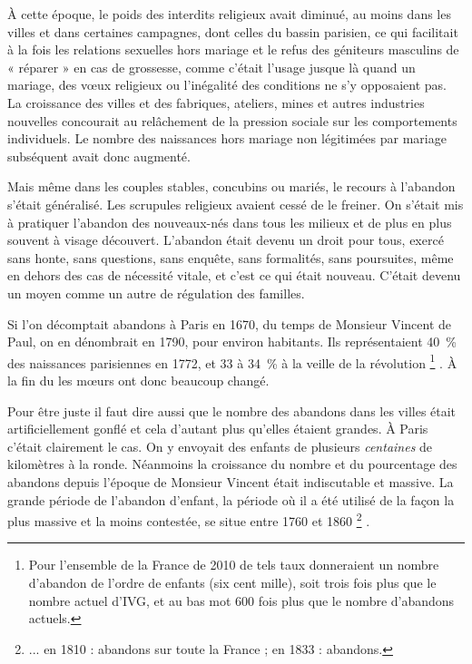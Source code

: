  




 À cette époque, le poids des interdits religieux avait diminué, au moins dans les villes et dans certaines campagnes, dont celles du bassin parisien, ce qui facilitait à la fois les relations sexuelles hors mariage et le refus des géniteurs masculins de « réparer » en cas de grossesse, comme c'était l'usage jusque là quand un mariage, des vœux religieux ou l'inégalité des conditions ne s'y opposaient pas. La croissance des villes et des fabriques, ateliers, mines et autres industries nouvelles concourait au relâchement de la pression sociale sur les comportements individuels. Le nombre des naissances hors mariage non légitimées par mariage subséquent avait donc augmenté. 

 Mais même dans les couples stables, concubins ou mariés, le recours à l'abandon s'était généralisé. Les scrupules religieux avaient cessé de le freiner. On s'était mis à pratiquer l'abandon des nouveaux-nés dans tous les milieux et de plus en plus souvent à visage découvert. L'abandon était devenu un droit pour tous, exercé sans honte, sans questions, sans enquête, sans formalités, sans poursuites, même en dehors des cas de nécessité vitale, et c'est ce qui était nouveau. C'était devenu un moyen comme un autre de régulation des familles. 
 
  Si l'on décomptait  abandons à Paris en 1670, du temps de Monsieur Vincent de Paul, on en dénombrait  en 1790, pour environ  habitants. Ils représentaient 40~\% des naissances parisiennes en 1772, et 33 à 34~\% à la veille de la révolution%
\footnote{Pour l'ensemble de la France de 2010 de tels taux donneraient un nombre d'abandon de l'ordre de  enfants (six cent mille), soit trois fois plus que le nombre actuel d'IVG, et au bas mot 600 fois plus que le nombre d'abandons actuels.}%
. À la fin du  les mœurs ont donc beaucoup changé.

 Pour être juste il faut dire aussi que le nombre des abandons dans les villes était artificiellement gonflé et cela d'autant plus qu'elles étaient grandes. À Paris c'était clairement le cas. On y envoyait des enfants de plusieurs \emph{centaines} de kilomètres à la ronde. Néanmoins la croissance du nombre et du pourcentage des abandons depuis l'époque de Monsieur Vincent était indiscutable et massive. La grande période de l'abandon d'enfant, la période où il a été utilisé de la façon la plus massive et la moins contestée, se situe entre 1760 et 1860%
\footnote{... en 1810 :  abandons sur toute la France ; en 1833 :  abandons.}%
.

